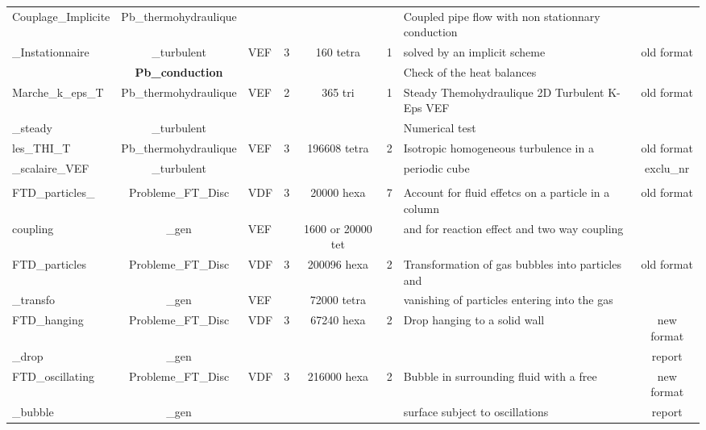 \begin{table}[H]
\begin{centering}
\begin{tabular}{lclccclc}
\rowcolor{Blue!10}Couplage\_Implicite & Pb\_thermohydraulique & & & & & Coupled pipe flow with non stationnary conduction & \\ 
\rowcolor{Blue!10}\_Instationnaire & \_turbulent & VEF & 3 & 160 tetra & 1 & solved by an implicit scheme & old format \\ 
\rowcolor{Blue!10} & \textbf{Pb\_conduction} & & & & & Check of the heat balances & \\ \hline
\rowcolor{Blue!10}Marche\_k\_eps\_T & Pb\_thermohydraulique & VEF & 2 & 365 tri & 1 & Steady Themohydraulique 2D Turbulent K-Eps VEF & old format \\ 
\rowcolor{Blue!10}\_steady & \_turbulent & & & & & Numerical test & \\ \hline
\rowcolor{Blue!10}les\_THI\_T & Pb\_thermohydraulique & VEF & 3 & 196608 tetra & 2 & Isotropic homogeneous turbulence in a & old format \\ 
\rowcolor{Blue!10}\_scalaire\_VEF & \_turbulent & & & & & periodic cube & exclu\_nr\\ \hline
\rowcolor{Orchid} \multicolumn{8}{c}{\textbf{Two-phase Flows with Front-Tracking}} \\
\hline
\rowcolor{Orchid!10}FTD\_particles\_ & Probleme\_FT\_Disc & VDF & 3 & 20000 hexa & 7 & Account for fluid effetcs on a particle in a column  & old format \\ 
\rowcolor{Orchid!10}coupling & \_gen & VEF & & 1600 or 20000 tet & & and for reaction effect and two way coupling & \\ \hline
\rowcolor{Orchid!10}FTD\_particles & Probleme\_FT\_Disc & VDF & 3 & 200096 hexa & 2 & Transformation of gas bubbles into particles and & old format \\ 
\rowcolor{Orchid!10}\_transfo & \_gen & VEF &  & 72000 tetra & & vanishing of particles entering into the gas & \\ \hline
\rowcolor{Orchid!10}FTD\_hanging & Probleme\_FT\_Disc & VDF & 3 & 67240 hexa & 2 & Drop hanging to a solid wall & new format \\ 
\rowcolor{Orchid!10}\_drop & \_gen & & & & & & report \\ \hline
\rowcolor{Orchid!10}FTD\_oscillating & Probleme\_FT\_Disc & VDF & 3 & 216000 hexa & 2 & Bubble in surrounding fluid with a free  & new format \\ 
\rowcolor{Orchid!10}\_bubble & \_gen & & & & & surface subject to oscillations & report \\ \hline
	\end{tabular}
\end{centering}
\end{table}


